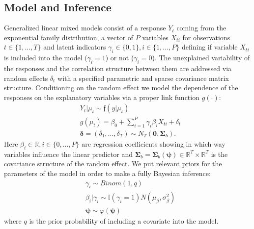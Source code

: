 \documentclass[a0,portrait]{a0poster}
\begin{document}
\begin{multicols}{2}

\color{DarkSlateGray} %

\section*{Model and Inference}

Generalized linear mixed models consist of a response $Y_{t}$ coming from the exponential family distribution, a vector of $P$ variables $X_{ti}$ for observations $t \in \{1,...,T\}$ and latent indicators $\gamma_i\in\{0,1\}, i \in \{1,...,P\}$ defining if variable $X_{ti}$ is  included into the model ($\gamma_i = 1$) or not ($\gamma_i = 0$). The unexplained variability of the responses and the correlation structure between them are addressed via random effects $\delta_t$ with a specified parametric and sparse covariance matrix structure. Conditioning on the random effect we model the dependence of the responses on the explanatory variables via a proper link function $g(\cdot)$:
\begin{eqnarray} \label{themodeleq}
  &Y_t|\mu_t \sim  \mathfrak{f}(y|\mu_t)\\
  &g(\mu_t) =   \beta_0 + \sum_{i=1}^{P} \gamma_i\beta_{i}X_{ti} + \delta_t\\
 &\boldsymbol{\delta} = (\delta_1,...,\delta_T) \sim N_T\left(\boldsymbol{0},\boldsymbol{\Sigma}_b\right).\label{themodeleqend}
\end{eqnarray}
Here $\beta_i \in \mathbb{R}, i \in \{0,...,P\}$ are regression coefficients showing in which way variables influence the linear predictor and $\boldsymbol{\Sigma}_b = \boldsymbol{\Sigma}_b\left(\boldsymbol{\psi}\right) \in \mathbb{R}^T\times\mathbb{R}^T$ is the covariance structure of the random effect. We put relevant priors for the parameters of the model in order to make a fully Bayesian inference:
\begin{eqnarray}
&\gamma_i \sim Binom(1,q)\label{glmgammaprior}\\	
&\beta_i|\gamma_i \sim \mathbb{I}(\gamma_i = 1) N(\mu_\beta,\sigma_{\beta}^2)\label{glmbetarprior}\\
&\boldsymbol{\psi}\sim\varphi(\boldsymbol{\psi})\label{latentprior}
\end{eqnarray}
where $q$ is the prior probability of including a covariate into the model. 


\end{multicols}
\end{document}
